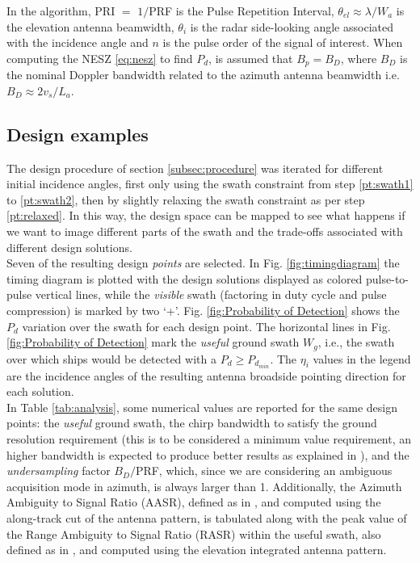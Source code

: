 \documentclass[conference,a4paper]{IEEEtran}
\begin{document}
    In the algorithm, PRI $=$ $1/$PRF is the Pulse Repetition Interval, $\theta_{el} \approx \lambda/W_a$ is the elevation antenna beamwidth, $\theta_i$ is the radar side-looking angle associated with the incidence angle and $n$ is the pulse order of the signal of interest.
    When computing the NESZ \eqref{eq:nesz} to find $P_d$, is assumed that $B_p = B_D$, where $B_D$ is the nominal Doppler bandwidth related to the azimuth antenna beamwidth i.e. $B_D \approx 2 v_s / L_a$.

    \subsection{Design examples}
    \label{subsec:analysis}
    The design procedure of section \ref{subsec:procedure} was iterated for different initial incidence angles, first only using the swath constraint from step \ref{pt:swath1} to \ref{pt:swath2}, then by slightly relaxing the swath constraint as per step \ref{pt:relaxed}.
    In this way, the design space can be mapped to see what happens if we want to image different parts of the swath and the trade-offs associated with different design solutions.\\
    Seven of the resulting design \emph{points} are selected.
    In Fig. \ref{fig:timingdiagram} the timing diagram is plotted with the design solutions displayed as colored pulse-to-pulse vertical lines, while the \emph{visible} swath (factoring in duty cycle and pulse compression) is marked by two `+'.
    Fig. \ref{fig:Probability of Detection} shows the $P_d$ variation over the swath for each design point.
    The horizontal lines in Fig. \ref{fig:Probability of Detection} mark the \emph{useful} ground swath $W_g$, i.e., the swath over which ships would be detected with a $P_d \geq P_{d_{min}}$.%
    The $\eta_i$ values in the legend are the incidence angles of the resulting antenna broadside pointing direction for each solution.\\
    In Table \ref{tab:analysis}, some numerical values are reported for the same design points: the \emph{useful} ground swath, the chirp bandwidth to satisfy the ground resolution requirement (this is to be considered a minimum value requirement, an higher bandwidth is expected to produce better results as explained in \cite{DLRjournal}), and the \emph{undersampling} factor $B_D/$PRF, which, since we are considering an ambiguous acquisition mode in azimuth, is always larger than 1.
    Additionally, the Azimuth Ambiguity to Signal Ratio (AASR), defined as in \cite{curlander1991synthetic}, and computed using the along-track cut of the antenna pattern, is tabulated along with the peak value of the Range Ambiguity to Signal Ratio (RASR) within the useful swath, also defined as in \cite{curlander1991synthetic}, and computed using the elevation integrated antenna pattern.
\end{document}
